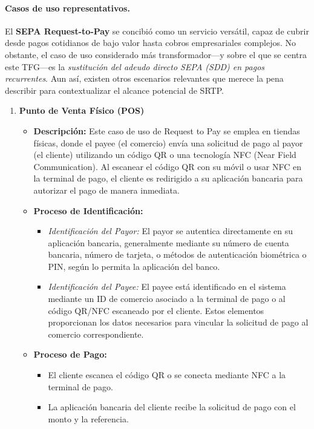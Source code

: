 \paragraph{Casos de uso representativos.}
El \textbf{SEPA Request-to-Pay} se concibió como un servicio versátil, capaz de cubrir desde pagos cotidianos de bajo valor hasta cobros empresariales complejos. No obstante, el caso de uso considerado más transformador—y sobre el que se centra este TFG—es la \emph{sustitución del adeudo directo SEPA (SDD) en pagos recurrentes}. Aun así, existen otros escenarios relevantes que merece la pena describir para contextualizar el alcance potencial de SRTP.

\begin{enumerate}
    \item \textbf{Punto de Venta Físico (POS)}
    \begin{itemize}
        \item \textbf{Descripción:} Este caso de uso de Request to Pay se emplea en tiendas físicas, donde el payee (el comercio) envía una solicitud de pago al payor (el cliente) utilizando un código QR o una tecnología NFC (Near Field Communication). Al escanear el código QR con su móvil o usar NFC en la terminal de pago, el cliente es redirigido a su aplicación bancaria para autorizar el pago de manera inmediata.
        \item \textbf{Proceso de Identificación:}
        \begin{itemize}
            \item \textit{Identificación del Payor:} El payor se autentica directamente en su aplicación bancaria, generalmente mediante su número de cuenta bancaria, número de tarjeta, o métodos de autenticación biométrica o PIN, según lo permita la aplicación del banco.
            \item \textit{Identificación del Payee:} El payee está identificado en el sistema mediante un ID de comercio asociado a la terminal de pago o al código QR/NFC escaneado por el cliente. Estos elementos proporcionan los datos necesarios para vincular la solicitud de pago al comercio correspondiente.
        \end{itemize}
        \item \textbf{Proceso de Pago:}
        \begin{itemize}
            \item El cliente escanea el código QR o se conecta mediante NFC a la terminal de pago.
            \item La aplicación bancaria del cliente recibe la solicitud de pago con el monto y la referencia.

\end{itemize}
\end{itemize}
\end{enumerate}
